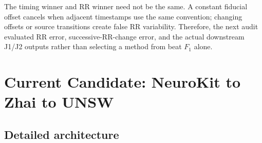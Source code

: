 \documentclass[10pt]{article}
\begin{document}
The timing winner and RR winner need not be the same. A constant fiducial
offset cancels when adjacent timestamps use the same convention; changing
offsets or source transitions create false RR variability. Therefore, the next
audit evaluated RR error, successive-RR-change error, and the actual downstream
J1/J2 outputs rather than selecting a method from beat $F_1$ alone.

\section{Current Candidate: NeuroKit to Zhai to UNSW}

\subsection{Detailed architecture}
\end{document}
